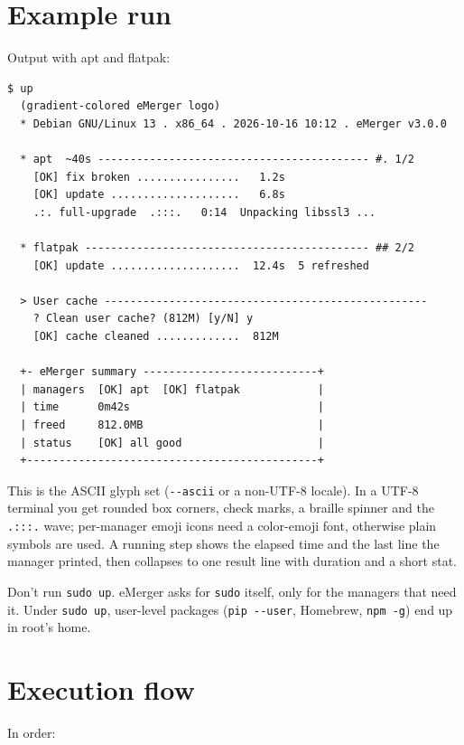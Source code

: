 \documentclass[11pt,a4paper]{article}
\begin{document}
\section{Example run}\label{sec:firstrun}

Output with apt and flatpak:

\begin{lstlisting}[basicstyle=\ttfamily\footnotesize]
$ up
  (gradient-colored eMerger logo)
  * Debian GNU/Linux 13 . x86_64 . 2026-10-16 10:12 . eMerger v3.0.0

  * apt  ~40s ------------------------------------------ #. 1/2
    [OK] fix broken ................   1.2s
    [OK] update ....................   6.8s
    .:. full-upgrade  .:::.   0:14  Unpacking libssl3 ...

  * flatpak -------------------------------------------- ## 2/2
    [OK] update ....................  12.4s  5 refreshed

  > User cache --------------------------------------------------
    ? Clean user cache? (812M) [y/N] y
    [OK] cache cleaned .............  812M

  +- eMerger summary ---------------------------+
  | managers  [OK] apt  [OK] flatpak            |
  | time      0m42s                             |
  | freed     812.0MB                           |
  | status    [OK] all good                     |
  +---------------------------------------------+
\end{lstlisting}

This is the ASCII glyph set (\texttt{-{}-ascii} or a non-UTF-8
locale). In a UTF-8 terminal you get rounded box corners, check marks, a
braille spinner and the \texttt{.:::.} wave; per-manager emoji icons need
a color-emoji font, otherwise plain symbols are used. A running step
shows the elapsed time and the last line the manager printed, then
collapses to one result line with duration and a short stat.

\begin{warn}
Don't run \texttt{sudo up}. eMerger asks for \texttt{sudo} itself, only
for the managers that need it. Under \verb|sudo up|, user-level packages
(\texttt{pip -{}-user}, Homebrew, \texttt{npm -g}) end up in root's home.
\end{warn}

\section{Execution flow}\label{sec:flow}
In order:
\end{document}
